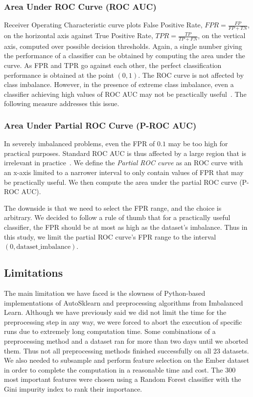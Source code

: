 \documentclass[conference]{IEEEtran}
\begin{document}
\subsubsection{Area Under ROC Curve (ROC AUC)}
\label{subsubsection:roc-curve}

Receiver Operating Characteristic curve plots False Positive Rate, $FPR = \frac{FP}{FP + TN}$, on
the horizontal axis against True Positive Rate, $TPR = \frac{TP}{TP + FN}$, on the vertical axis,
computed over possible decision thresholds. Again, a single number giving the performance of a
classifier can be obtained by computing the area under the curve. As FPR and TPR go against each
other, the perfect classification performance is obtained at the point $(0, 1)$. The ROC curve is
not affected by class imbalance. However, in the presence of extreme class imbalance, even a
classifier achieving high values of ROC AUC may not be practically useful~\cite{brabec2018}. The
following measure addresses this issue.


\subsubsection{Area Under Partial ROC Curve (P-ROC AUC)}

In severely imbalanced problems, even the FPR of $0.1$ may be too high for practical purposes.
Standard ROC AUC is thus affected by a large region that is irrelevant in
practice~\cite{brabec2018}. We define the \emph{Partial ROC curve} as an ROC curve with an x-axis
limited to a narrower interval to only contain values of FPR that may be practically useful.  We
then compute the area under the partial ROC curve (P-ROC AUC).

The downside is that we need to select the FPR range, and the choice is arbitrary. We decided to
follow a rule of thumb that for a practically useful classifier, the FPR should be at most as high
as the dataset's imbalance. Thus in this study, we limit the partial ROC curve's FPR range to the
interval $(0, \mathrm{dataset\_imbalance})$.


\subsection{Limitations}
\label{subsection:limitations}

The main limitation we have faced is the slowness of Python-based implementations of AutoSklearn
and preprocessing algorithms from Imbalanced Learn. Although we have previously said we did not
limit the time for the preprocessing step in any way, we were forced to abort the execution of
specific runs due to extremely long computation time. Some combinations of a preprocessing method
and a dataset ran for more than two days until we aborted them. Thus not all preprocessing methods
finished successfully on all 23 datasets. We also needed to subsample and perform feature selection
on the Ember dataset in order to complete the computation in a reasonable time and cost. The 300
most important features were chosen using a Random Forest classifier with the Gini impurity index
to rank their importance.
\end{document}
